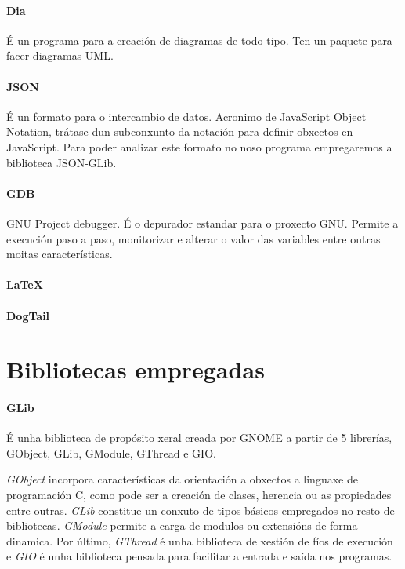 \paragraph{Dia} É un programa para a creación de diagramas de todo tipo. Ten un paquete para facer diagramas UML.

\paragraph{JSON} É un formato para o intercambio de datos. Acronimo de JavaScript Object Notation, trátase dun subconxunto da notación para definir obxectos en JavaScript. Para poder analizar este formato no noso programa empregaremos a biblioteca JSON-GLib.

\paragraph{GDB} GNU Project debugger. É o depurador estandar para o proxecto GNU. Permite a execución paso a paso, monitorizar e alterar o valor das variables entre outras moitas características.

\paragraph{\LaTeX}

\paragraph{DogTail}


\section{Bibliotecas empregadas}

\paragraph{GLib} É unha biblioteca de propósito xeral creada por GNOME a partir de 5 librerías, GObject, GLib, GModule, GThread e GIO.

\emph{GObject} incorpora características da orientación a obxectos a linguaxe de programación C, como pode ser a creación de clases, herencia ou as propiedades entre outras. \emph{GLib} constitue un conxuto de tipos básicos empregados no resto de bibliotecas. \emph{GModule} permite a carga de modulos ou extensións de forma dinamica. Por último, \emph{GThread} é unha biblioteca de xestión de fíos de execución e \emph{GIO} é unha biblioteca pensada para facilitar a entrada e saída nos programas.

